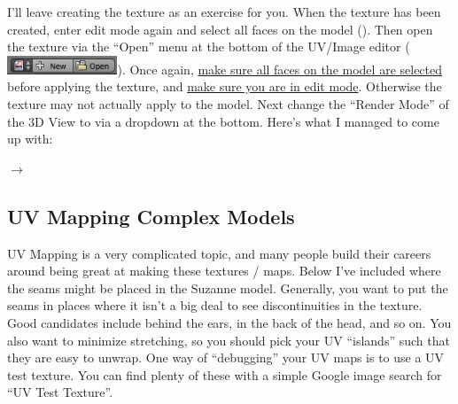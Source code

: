 \documentclass[11pt]{article}
\begin{document}
I'll leave creating the texture as an exercise for you.  When the texture has been created, enter
edit mode again and select all faces on the model ().  Then open the texture via the ``Open''
menu at the bottom of the UV/Image editor (\includegraphics[height=1.5em]{open-texture-button}).
Once again, \underline{make sure all faces on the model are selected} before applying the texture,
and \underline{make sure you are in edit mode}.  Otherwise the texture may not actually apply to the model.
Next change the ``Render Mode'' of the 3D View to  via a dropdown at the bottom.
Here's what I managed to come up with:
\begin{center}
     $\rightarrow$
\end{center}

\subsection{UV Mapping Complex Models}

UV Mapping is a very complicated topic, and many people build their careers around being great at 
making these textures / maps.  Below I've included where the seams might be placed in the Suzanne
model.  Generally, you want to put the seams in places where it isn't a big deal to see 
discontinuities in the texture.  Good candidates include behind the ears, in the back of the head,
and so on.  You also want to minimize stretching, so you should pick your UV ``islands'' such that
they are easy to unwrap.  One way of ``debugging'' your UV maps is to use a UV test texture.  You
can find plenty of these with a simple Google image search for ``UV Test Texture''.
\end{document}
